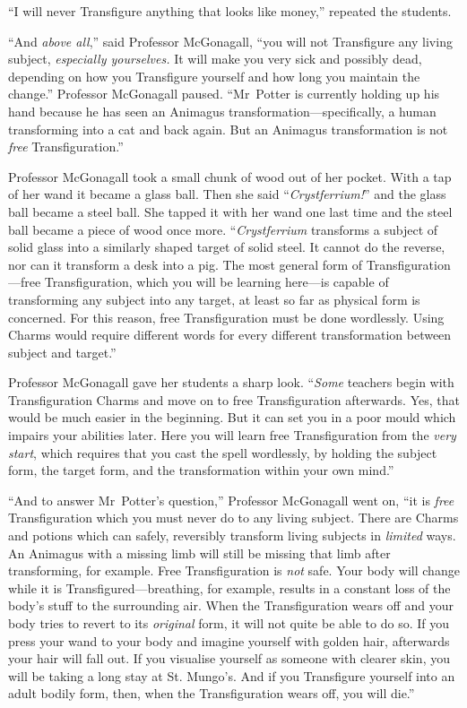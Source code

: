 “I will never Transfigure anything that looks like money,” repeated the students.

“And \emph{above all},” said Professor McGonagall, “you will not Transfigure any living subject, \emph{especially yourselves.} It will make you very sick and possibly dead, depending on how you Transfigure yourself and how long you maintain the change.” Professor McGonagall paused. “Mr~Potter is currently holding up his hand because he has seen an Animagus transformation—specifically, a human transforming into a cat and back again. But an Animagus transformation is not \emph{free} Transfiguration.”

Professor McGonagall took a small chunk of wood out of her pocket. With a tap of her wand it became a glass ball. Then she said “\emph{Crystferrium!}” and the glass ball became a steel ball. She tapped it with her wand one last time and the steel ball became a piece of wood once more. “\emph{Crystferrium} transforms a subject of solid glass into a similarly shaped target of solid steel. It cannot do the reverse, nor can it transform a desk into a pig. The most general form of Transfiguration—free Transfiguration, which you will be learning here—is capable of transforming any subject into any target, at least so far as physical form is concerned. For this reason, free Transfiguration must be done wordlessly. Using Charms would require different words for every different transformation between subject and target.”

Professor McGonagall gave her students a sharp look. “\emph{Some} teachers begin with Transfiguration Charms and move on to free Transfiguration afterwards. Yes, that would be much easier in the beginning. But it can set you in a poor mould which impairs your abilities later. Here you will learn free Transfiguration from the \emph{very start}, which requires that you cast the spell wordlessly, by holding the subject form, the target form, and the transformation within your own mind.”

“And to answer Mr~Potter’s question,” Professor McGonagall went on, “it is \emph{free} Transfiguration which you must never do to any living subject. There are Charms and potions which can safely, reversibly transform living subjects in \emph{limited} ways. An Animagus with a missing limb will still be missing that limb after transforming, for example. Free Transfiguration is \emph{not} safe. Your body will change while it is Transfigured—breathing, for example, results in a constant loss of the body’s stuff to the surrounding air. When the Transfiguration wears off and your body tries to revert to its \emph{original} form, it will not quite be able to do so. If you press your wand to your body and imagine yourself with golden hair, afterwards your hair will fall out. If you visualise yourself as someone with clearer skin, you will be taking a long stay at St. Mungo’s. And if you Transfigure yourself into an adult bodily form, then, when the Transfiguration wears off, you will die.”

